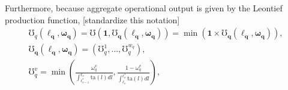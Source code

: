\documentclass[hidelinks, nonatbib]{elsarticle}
\begin{document}
Furthermore, because aggregate operational output is given by the Leontief production function, [standardize this notation]
\begin{gather}
    \mho_{q}(
        \boldsymbol{\ell_{q}}
        ,\boldsymbol{\omega_{q}}
    )
    =
    \mho(
        \boldsymbol{1},
        \boldsymbol{\mho_q}(
            \boldsymbol{\ell_{q}}
            ,\boldsymbol{\omega_{q}}
        )
    )
    =
    \min(
        \boldsymbol{1}
        \times
        \boldsymbol{\mho_q}(
            \boldsymbol{\ell_{q}}
            ,\boldsymbol{\omega_{q}}
        )
    )
    ,
    \\
    \boldsymbol{\mho_q}(
        \boldsymbol{\ell_{q}}
        ,\boldsymbol{\omega_{q}}
    )
    =
    (
        \mho_{q}^{1}
        ,
        \dots
        ,
        \mho_{q}^{w_q}
    )
    ,
    \\
    \mho_{q}^{v} = 
    \min
    \left(
            \frac{
                \omega_{q}^{v}
            }{
                \int_{\ell_{v-1}^{*}}^{\ell_v}{
                    \text{ta}(l)dl
                }
            }
            ,
            \frac{
                1 - \omega_{q}^{v}
            }{
                \int_{\ell_v}^{\ell_{v}^{*}}{
                    \text{ta}(l)dl
                }
            }
        \right)
    ,
\end{gather}
\end{document}
